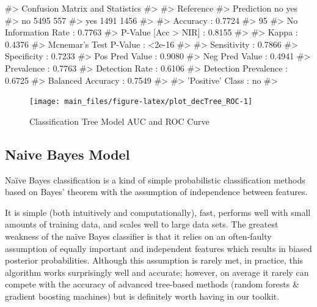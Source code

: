 \begin{Schunk}
\begin{Soutput}
#> Confusion Matrix and Statistics
#> 
#>           Reference
#> Prediction   no  yes
#>        no  5495  557
#>        yes 1491 1456
#>                                          
#>                Accuracy : 0.7724         
#>                  95%
#>     No Information Rate : 0.7763         
#>     P-Value [Acc > NIR] : 0.8155         
#>                                          
#>                   Kappa : 0.4376         
#>  Mcnemar's Test P-Value : <2e-16         
#>                                          
#>             Sensitivity : 0.7866         
#>             Specificity : 0.7233         
#>          Pos Pred Value : 0.9080         
#>          Neg Pred Value : 0.4941         
#>              Prevalence : 0.7763         
#>          Detection Rate : 0.6106         
#>    Detection Prevalence : 0.6725         
#>       Balanced Accuracy : 0.7549         
#>                                          
#>        'Positive' Class : no             
#> 
\end{Soutput}
\end{Schunk}

\begin{Schunk}
\begin{figure}[H]

{\centering \texttt{[image: main\_files/figure-latex/plot\_decTree\_ROC-1]} 

}

\caption[Classification Tree Model AUC and ROC Curve]{Classification Tree Model AUC and ROC Curve}\label{fig:plot_decTree_ROC}
\end{figure}
\end{Schunk}

\hypertarget{naive-bayes-model}{%
\subsection{Naive Bayes Model}\label{naive-bayes-model}}

Naïve Bayes classification is a kind of simple probabilistic
classification methods based on Bayes' theorem with the assumption of
independence between features.

It is simple (both intuitively and computationally), fast, performs well
with small amounts of training data, and scales well to large data sets.
The greatest weakness of the naïve Bayes classifier is that it relies on
an often-faulty assumption of equally important and independent features
which results in biased posterior probabilities. Although this
assumption is rarely met, in practice, this algorithm works surprisingly
well and accurate; however, on average it rarely can compete with the
accuracy of advanced tree-based methods (random forests \& gradient
boosting machines) but is definitely worth having in our toolkit.


